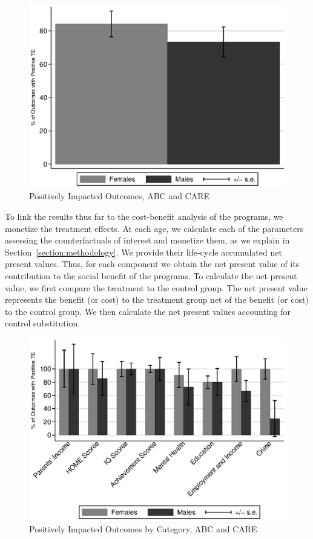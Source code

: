 \begin{figure}[H]
		\caption{Positively Impacted Outcomes, ABC and CARE} \label{fig:ppositive}
		\includegraphics[width=.7\columnwidth]{output/itt_noctrl_all.eps}
\end{figure}

To link the results thus far to the cost-benefit analysis of the programs, we monetize the treatment effects. At each age, we calculate each of the parameters assessing the counterfactuals of interest and monetize them, as we explain in Section~\ref{section:methodology}. We provide their life-cycle accumulated net present values. Thus, for each component we obtain the net present value of its contribution to the social benefit of the programs. To calculate the net present value, we first compare the treatment to the control group. The net present value represents the benefit (or cost) to the treatment group net of the benefit (or cost) to the control group. We then calculate the net present values accounting for control substitution.

\begin{figure}[H]
		\caption{Positively Impacted Outcomes by Category, ABC and CARE} \label{fig:ppositivecategory1}
		\includegraphics[width=.8\columnwidth]{output/itt_noctrl_cats1.eps}
\end{figure}

